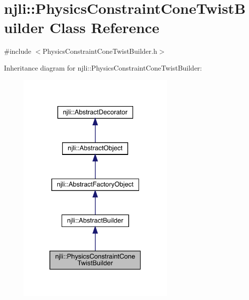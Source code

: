 \hypertarget{classnjli_1_1_physics_constraint_cone_twist_builder}{}\section{njli\+:\+:Physics\+Constraint\+Cone\+Twist\+Builder Class Reference}
\label{classnjli_1_1_physics_constraint_cone_twist_builder}


{\ttfamily \#include $<$Physics\+Constraint\+Cone\+Twist\+Builder.\+h$>$}



Inheritance diagram for njli\+:\+:Physics\+Constraint\+Cone\+Twist\+Builder\+:\nopagebreak
\begin{figure}[H]
\begin{center}
\leavevmode
\includegraphics[width=218pt]{classnjli_1_1_physics_constraint_cone_twist_builder__inherit__graph}
\end{center}
\end{figure}


